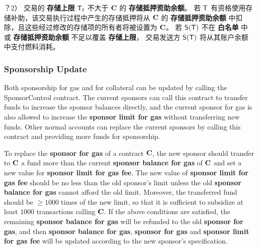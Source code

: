 ？2） 交易的 {\bf 存储上限} $\textsf{T}_\ell$ 不大于 $\mathbf{C}$ 的 {\bf 存储抵押资助余额}。
若 $\textsf{T}$ 有资格使用存储补助，该交易执行过程中产生的存储抵押将从 $\mathbf{C}$ 的 \textbf{存储抵押资助余额} 中扣除，且这些经过修改的存储项的所有者将被设置为 $\mathbf{C}$。
若 $\mathsf{S}{\left({\textsf{T}} \right)}$ 不在 \textbf{白名单} 中或 \textbf{存储抵押资助余额} 不足以覆盖 {\bf 存储上限}， 交易发送方 $\mathsf{S}{\left({\textsf{T}} \right)}$ 将从其账户余额中支付燃料消耗。


\subsubsection{Sponsorship Update}

Both sponsorship for gas and for collateral can be updated by calling the SponsorControl contract.
The current sponsors can call this contract to transfer funds to increase the sponsor balances directly,
and the current sponsor for gas is also allowed to increase the \textbf{sponsor limit for gas} without transferring new funds.
Other normal accounts can replace the current sponsors by calling this contract and providing more funds for sponsorship.



To replace the \textbf{sponsor for gas} of a contract $\mathbf{C}$, the new sponsor should transfer to $\mathbf{C}$ a fund more than the current \textbf{sponsor balance for gas} of $\mathbf{C}$ and set a new value for \textbf{sponsor limit for gas fee}.
The new value of \textbf{sponsor limit for gas fee} should be no less than the old sponsor's limit  
unless the old \textbf{sponsor balance for gas} cannot afford the old limit.
Moreover, the transferred fund should be $\ge 1000$ times of the new limit, so that it is sufficient to subsidize at least $1000$  transactions calling $\mathbf{C}$. 
If the above conditions are satisfied, the remaining \textbf{sponsor balance for gas} will be refunded to the old \textbf{sponsor for gas},
and then \textbf{sponsor balance for gas}, \textbf{sponsor for gas} and \textbf{sponsor limit for gas fee} will be updated according to the new sponsor's specification.


